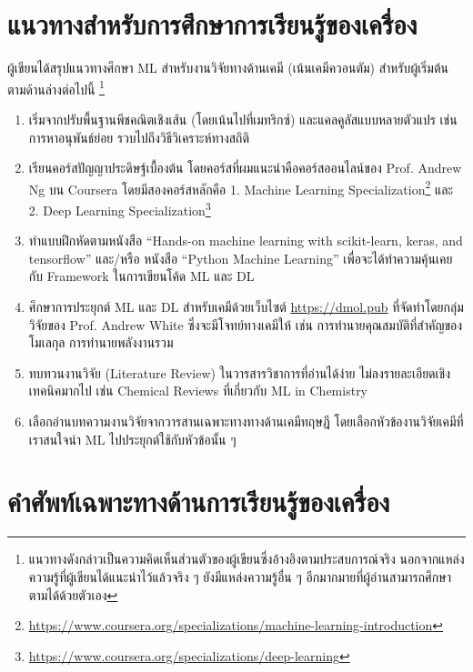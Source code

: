 \section{แนวทางสำหรับการศึกษาการเรียนรู้ของเครื่อง}
\label{sec:learn_ml}

ผู้เขียนได้สรุปแนวทางศึกษา ML สำหรับงานวิจัยทางด้านเคมี (เน้นเคมีควอนตัม) สำหรับผู้เริ่มต้นตามด้านล่างต่อไปนี้
\footnote{แนวทางดังกล่าวเป็นความคิดเห็นส่วนตัวของผู้เขียนซึ่งอ้างอิงตามประสบการณ์จริง นอกจากแหล่งความรู้ที่ผู้เขียนได้แนะนำไว้แล้วจริง ๆ 
ยังมีแหล่งความรู้อื่น ๆ อีกมากมายที่ผู้อ่านสามารถศึกษาตามได้ด้วยตัวเอง}

\begin{enumerate}
    \item เริ่มจากปรับพื้นฐานพีชคณิตเชิงเส้น (โดยเน้นไปที่เมทริกซ์) และแคลคูลัสแบบหลายตัวแปร เช่น การหาอนุพันธ์ย่อย รวบไปถึงวิธีวิเคราะห์ทางสถิติ
    \item เรียนคอร์สปัญญาประดิษฐ์เบื้องต้น โดยคอร์สที่ผมแนะนำคือคอร์สออนไลน์ของ Prof. Andrew Ng บน Coursera โดยมีสองคอร์สหลักคือ 
    1. Machine Learning Specialization\footnote{\url{https://www.coursera.org/specializations/machine-learning-introduction}} และ 
    2. Deep Learning Specialization\footnote{\url{https://www.coursera.org/specializations/deep-learning}}
    \item ทำแบบฝึกหัดตามหนังสือ \enquote{Hands-on machine learning with scikit-learn, keras, and tensorflow} และ/หรือ 
    หนังสือ \enquote{Python Machine Learning} เพื่อจะได้ทำความคุ้นเคยกับ Framework ในการเขียนโค้ด ML และ DL
    \item ศึกษาการประยุกต์ ML และ DL สำหรับเคมีด้วยเว็บไซต์ \url{https://dmol.pub} ที่จัดทำโดยกลุ่มวิจัยของ Prof. Andrew White 
    ซึ่งจะมีโจทย์ทางเคมีให้ เช่น การทำนายคุณสมบัติที่สำคัญของโมเลกุล การทำนายพลังงานรวม
    \item ทบทวนงานวิจัย (Literature Review) ในวารสารวิชาการที่อ่านได้ง่าย ไม่ลงรายละเอียดเชิงเทคนิคมากไป เช่น Chemical Reviews 
    ที่เกี่ยวกับ ML in Chemistry
    \item เลือกอ่านบทความงานวิจัยจากวารสานเฉพาะทางทางด้านเคมีทฤษฎี โดยเลือกหัวข้องานวิจัยเคมีที่เราสนใจนำ ML ไปประยุกต์ใช้กับหัวข้อนั้น ๆ
\end{enumerate}

\section{คำศัพท์เฉพาะทางด้านการเรียนรู้ของเครื่อง}
\label{sec:ml_term}


